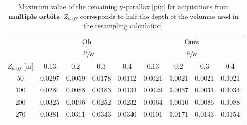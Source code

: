 \documentclass{ipol}
\begin{document}
\begin{table}[h!]

\begin{center}
\begin{tabular}{|c|c|c|c|c||c|c|c|c|}

\multicolumn{1}{c}{}  & \multicolumn{4}{c}{Oh~\cite{Oh2011}} & \multicolumn{4}{c}{Ours}   \\
 \cline{2-9} 
 \multicolumn{1}{c}{}  & \multicolumn{4}{|c||}{ $\sfrac{B}{H}$ } & \multicolumn{4}{|c|}{$\sfrac{B}{H}$ }  \\
 \multicolumn{1}{c|}{$Z_{buff}$ [m]}  &  0.13 &  0.2   & 0.3  &  0.4 &  0.13 &  0.2   & 0.3  &  0.4   \\
 \cline{1-9}
  
 50  &  0.0297    &  0.0059   & 0.0178   & 0.0112 & 0.0021   & 0.0021     & 0.0021    &  0.0021   \\
100  &  0.0284    &  0.0088   & 0.0183   & 0.0134 & 0.0029   & 0.0037     & 0.0034    &  0.0034   \\
200  &  0.0325    &  0.0196   & 0.0252   & 0.0232 & 0.0064   & 0.0010     & 0.0086    &  0.0088   \\
270  &  0.0381    &  0.0311   & 0.0343   & 0.0340 & 0.0101   & 0.0171     & 0.0143    &  0.0154   \\
\hline 

\end{tabular}
\end{center}
\caption{Maximum value of the remaining y-parallax [pix] for acquisitions from \textbf{multiple orbits}. $Z_{buff}$ corresponds to half the depth of the volumne used in the resampling calculation.}\label{tab:PHR1multi}
\end{table}
\end{document}
